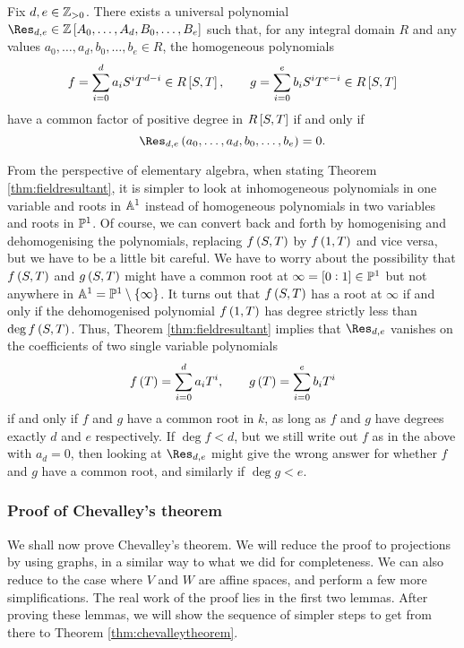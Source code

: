 \begin{theorem}
\label{thm:domainresultant}
Fix $ d, e \in \ZZ_{> 0} $. There exists a universal polynomial $ \Res_{d, e} \in \ZZ\sbr{A_0, \dots, A_d, B_0, \dots, B_e} $ such that, for any integral domain $ R $ and any values $ a_0, \dots, a_d, b_0, \dots, b_e \in R $, the homogeneous polynomials
$$ f = \sum_{i = 0}^d a_iS^iT^{d - i} \in R\sbr{S, T}, \qquad g = \sum_{i = 0}^e b_iS^iT^{e - i} \in R\sbr{S, T} $$
have a common factor of positive degree in $ R\sbr{S, T} $ if and only if
$$ \Res_{d, e}\br{a_0, \dots, a_d, b_0, \dots, b_e} = 0. $$
\end{theorem}

From the perspective of elementary algebra, when stating Theorem \ref{thm:fieldresultant}, it is simpler to look at inhomogeneous polynomials in one variable and roots in $ \AA^1 $ instead of homogeneous polynomials in two variables and roots in $ \PP^1 $. Of course, we can convert back and forth by homogenising and dehomogenising the polynomials, replacing $ f\br{S, T} $ by $ f\br{1, T} $ and vice versa, but we have to be a little bit careful. We have to worry about the possibility that $ f\br{S, T} $ and $ g\br{S, T} $ might have a common root at $ \infty = \sbr{0 : 1} \in \PP^1 $ but not anywhere in $ \AA^1 = \PP^1 \setminus \cbr{\infty} $. It turns out that $ f\br{S, T} $ has a root at $ \infty $ if and only if the dehomogenised polynomial $ f\br{1, T} $ has degree strictly less than $ \deg f\br{S, T} $. Thus, Theorem \ref{thm:fieldresultant} implies that $ \Res_{d, e} $ vanishes on the coefficients of two single variable polynomials
$$ f\br{T} = \sum_{i = 0}^d a_iT^i, \qquad g\br{T} = \sum_{i = 0}^e b_iT^i $$
if and only if $ f $ and $ g $ have a common root in $ k $, as long as $ f $ and $ g $ have degrees exactly $ d $ and $ e $ respectively. If $ \deg f < d $, but we still write out $ f $ as in the above with $ a_d = 0 $, then looking at $ \Res_{d, e} $ might give the wrong answer for whether $ f $ and $ g $ have a common root, and similarly if $ \deg g < e $.

\subsubsection{Proof of Chevalley's theorem}


We shall now prove Chevalley's theorem. We will reduce the proof to projections by using graphs, in a similar way to what we did for completeness. We can also reduce to the case where $ V $ and $ W $ are affine spaces, and perform a few more simplifications. The real work of the proof lies in the first two lemmas. After proving these lemmas, we will show the sequence of simpler steps to get from there to Theorem \ref{thm:chevalleytheorem}.

